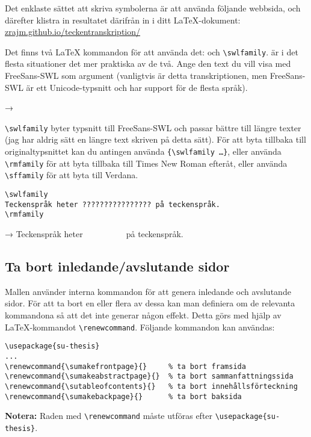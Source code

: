 Det enklaste sättet att skriva symbolerna är att använda följande webbsida, och
därefter klistra in resultatet därifrån in i ditt \LaTeX{}-dokument:
\href{https://zrajm.github.io/teckentranskription/}{\url{zrajm.github.io/teckentranskription/}}

Det finns två \LaTeX{} kommandon för att använda det:  och
\verb|\swlfamily|.  är i det flesta situationer det mer
praktiska av de två. Ange den text du vill visa med FreeSans-SWL som argument
(vanligtvis är detta transkriptionen, men FreeSans-SWL är ett Unicode-typsnitt
och har support för de flesta språk).

\medskip

\hspace{1em} → 

\medskip

\verb|\swlfamily| byter typsnitt till FreeSans-SWL och passar bättre till
längre texter (jag har aldrig sätt en längre text skriven på detta sätt). För
att byta tillbaka till originaltypsnittet kan du antingen använda
\verb|{\swlfamily …}|, eller använda \verb|\rmfamily| för att byta tillbaka
till Times New Roman efteråt, eller använda \verb|\sffamily| för att byta till
Verdana.

\begin{verbatim}
\swlfamily
Teckenspråk heter ???????????????? på teckenspråk.
\rmfamily
\end{verbatim}

\swlfamily
\hspace{1em}→ Teckenspråk heter 􌥃􌥔􌥘􌥃􌤵􌤷􌥧􌥡􌥼􌥲􌦊􌥱􌦈􌥼􌤟􌥣 på teckenspråk.
\rmfamily


\subsection{Ta bort inledande/avslutande sidor}
\label{genererade}

Mallen använder interna kommandon för att genera inledande och avslutande
sidor. För att ta bort en eller flera av dessa kan man definiera om de
relevanta kommandona så att det inte generar någon effekt. Detta görs med hjälp
av \LaTeX{}-kommandot \verb|\renewcommand|. Följande kommandon kan användas:

\begin{verbatim}
\usepackage{su-thesis}
...
\renewcommand{\sumakefrontpage}{}     % ta bort framsida
\renewcommand{\sumakeabstractpage}{}  % ta bort sammanfattningssida
\renewcommand{\sutableofcontents}{}   % ta bort innehållsförteckning
\renewcommand{\sumakebackpage}{}      % ta bort baksida
\end{verbatim}

\noindent\textbf{Notera:} Raden med \verb|\renewcommand| måste utföras efter
\verb|\usepackage{su-thesis}|.

